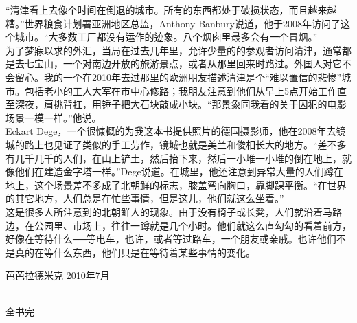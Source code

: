 “清津看上去像个时间在倒退的城市。所有的东西都处于破损状态，而且越来越糟。”世界粮食计划署亚洲地区总监，Anthony Banbury说道，他于2008年访问了这个城市。“大多数工厂都没有运作的迹象。八个烟囱里最多会有一个冒烟。”\\

为了梦寐以求的外汇，当局在过去几年里，允许少量的的参观者访问清津，通常都是去七宝山，一个对南边开放的旅游景点，或者从那里回来时路过。外国人对它不会留心。我的一个在2010年去过那里的欧洲朋友描述清津是个“难以置信的悲惨”城市。包括老小的工人大军在市中心修路；我朋友注意到他们从早上5点开始工作直至深夜，肩挑背扛，用锤子把大石块敲成小块。“那景象同我看的关于囚犯的电影场景一模一样。”他说。\\

Eckart Dege，一个很慷概的为我这本书提供照片的德国摄影师，他在2008年去镜城的路上也见证了类似的手工劳作，镜城也就是美兰和俊相长大的地方。“差不多有几千几千的人们，在山上铲土，然后抬下来，然后一小堆一小堆的倒在地上，就像他们在建造金字塔一样。”Dege说道。在城里，他还注意到异常大量的人们蹲在地上，这个场景差不多成了北朝鲜的标志，膝盖弯向胸口，靠脚踝平衡。“在世界的其它地方，人们总是在忙些事情，但是这儿，他们就这么坐着。”\\

这是很多人所注意到的北朝鲜人的现象。由于没有椅子或长凳，人们就沿着马路边，在公园里、市场上，往往一蹲就是几个小时。他们就这么直勾勾的看着前方，好像在等待什么──等电车，也许，或者等过路车，一个朋友或亲戚。也许他们不是真的在等什么东西，他们只是在等待着某些事情的变化。\\

\begin{flushright}
	芭芭拉德米克 2010年7月
\end{flushright}


\begin{center}
	{\FA } \\
	全书完
\end{center}